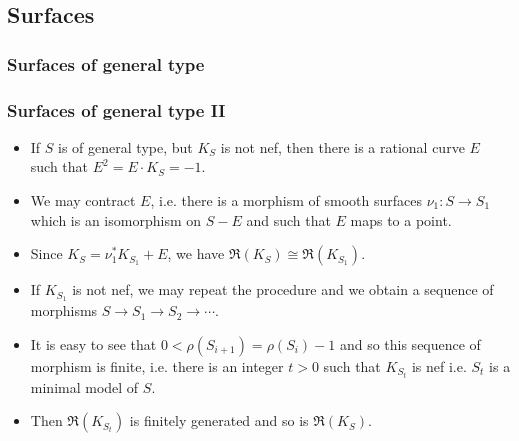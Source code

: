 \documentclass{beamer}
\theoremstyle{plain}
\theoremstyle{definition}
\theoremstyle{remark}
\def\OO{\mathcal {O}}
\begin{document}
\subsection{Surfaces}

\begin{frame}
  \frametitle{Surfaces of general type}

\end{frame}



\begin{frame}
  \frametitle{Surfaces of general type II}

\begin{itemize}\item If $S$ is of general type, but $K_S$ is not nef, then there is a rational curve $E$ such that $E^2=E\cdot K_S=-1$. 
\item We may contract $E$, i.e. there is a morphism of smooth surfaces
$\nu_1:S\to S_1$ which is an isomorphism on $S-E$ and such that $E$ maps to a point. \item Since $K_S=\nu_1^*K_{S_1}+E$, we have $\mathfrak{R}(K_S)\cong
\mathfrak{R}(K_{S_1})$.
\item If $K_{S_1}$ is not nef, we may repeat the procedure and we obtain a sequence of morphisms $S\to S_1\to S_2 \to \cdots$.
\item It is easy to see that $0<\rho (S_{i+1})=\rho (S_{i})-1$
and so this sequence of morphism is finite, i.e. there is an integer $t>0$ such that $K_{S_t}$ is nef i.e. $S_t$ is a minimal model of $S$.
\item Then $\mathfrak{R}(K_{S_t})$ is finitely generated and so is 
$\mathfrak{R}(K_S)$.
\end{itemize}

\end{frame}
\end{document}
